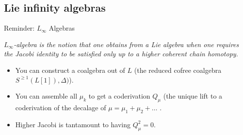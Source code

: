 \documentclass[beamer,10pt,handout]{standalone}  \Handouttrue
\begin{document}

\subsection{Lie infinity algebras}
\begin{frame}{Reminder: $L_\infty$ Algebras}

		\emph{
			$L_\infty$-algebra is the notion that one obtains from a Lie algebra when one requires the Jacobi identity to be satisfied only up to a higher coherent chain homotopy.
		}
		\\
		\vspace{.5em}
		\begin{defblock}
			
		\end{defblock}	
	\pause

	\begin{itemize}
		\item<2-> You can construct a coalgebra out of $L$ 
			{\small \color{UniGreen} (the reduced cofree coalgebra $S^{\geq 1}(L[1]),\Delta)$)}.
		\item<3-> You can assemble all $\mu_k$ to get a coderivation $Q_\mu$
				{\small \color{UniGreen} (the unique lift to a coderivation of the decalage of $ \mu=	\mu_1+\mu_2 + \dots$ }.
		\item<4-> Higher Jacobi is tantamount to having $Q_\mu ^2 = 0$.

	\end{itemize}
\end{frame}
\end{document}
